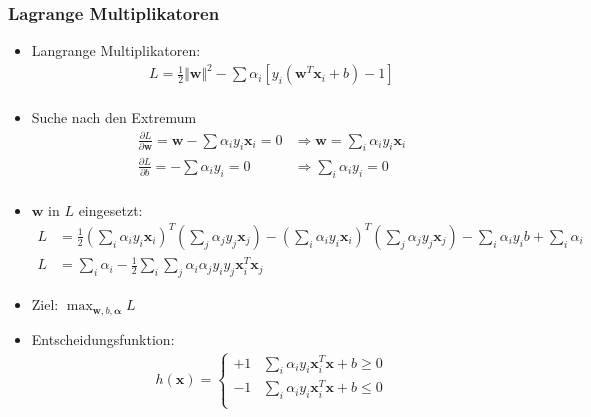 \begin{frame}
    \frametitle{Lagrange Multiplikatoren}

    \begin{itemize}
        \item Langrange Multiplikatoren:
            \begin{align*}
                L = \frac{1}{2} \Vert \boldsymbol{w} \Vert^2 - \sum \alpha_i \left[ y_i ( \boldsymbol{w}^T \boldsymbol{x}_i + b) - 1 \right] \\
            \end{align*}
        \item Suche nach den Extremum
            \begin{align*}
                \frac{\partial L}{\partial \boldsymbol{w}} = \boldsymbol{w} - \sum \alpha_i y_i \boldsymbol{x}_i = 0 &\Rightarrow \boldsymbol{w} = \sum_i \alpha_i y_i \boldsymbol{x}_i \\
                \frac{\partial L}{\partial b} = -\sum \alpha_i y_i = 0 &\Rightarrow \sum_i \alpha_i y_i = 0 \\
            \end{align*}
        \item $\boldsymbol{w}$ in $L$ eingesetzt:
            \begin{align*}
                L &= \frac{1}{2} (\sum_i \alpha_i y_i \boldsymbol{x}_i)^T (\sum_j \alpha_j y_j \boldsymbol{x}_j) - (\sum_i \alpha_i y_i \boldsymbol{x}_i)^T (\sum_j \alpha_j y_j \boldsymbol{x}_j) - \sum_i \alpha_i y_i b + \sum_i \alpha_i \\
                L &= \sum_i \alpha_i - \frac{1}{2} \sum_i \sum_j \alpha_i \alpha_j y_i y_j \boldsymbol{x}_i^T \boldsymbol{x}_j
            \end{align*}
        \item Ziel: $ \max_{\boldsymbol{w}, b, \boldsymbol{\alpha}} L$
        \item Entscheidungsfunktion:
            \begin{align*}
                h(\boldsymbol{x}) = \begin{cases}
                    +1 & \sum_i \alpha_i y_i \boldsymbol{x}_i^T \boldsymbol{x} + b \geq 0 \\
                    -1 & \sum_i \alpha_i y_i \boldsymbol{x}_i^T \boldsymbol{x} + b \leq 0 \\
                \end{cases}
            \end{align*}
    \end{itemize}
\end{frame}


